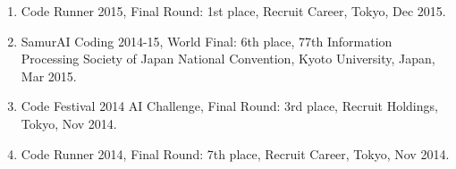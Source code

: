 \documentclass[a4j,twocolumn]{jarticle}
\begin{document}
\begin{enumerate}
 \item Code Runner 2015, Final Round: 1st place, Recruit Career, Tokyo, Dec 2015.
 \item SamurAI Coding 2014-15, World Final: 6th place, 77th Information Processing Society of Japan National Convention, Kyoto University, Japan, Mar 2015.
 \item Code Festival 2014 AI Challenge, Final Round: 3rd place, Recruit Holdings, Tokyo, Nov 2014.
 \item Code Runner 2014, Final Round: 7th place, Recruit Career, Tokyo, Nov 2014.
\end{enumerate}

\vspace{0.4cm}

\end{document}
